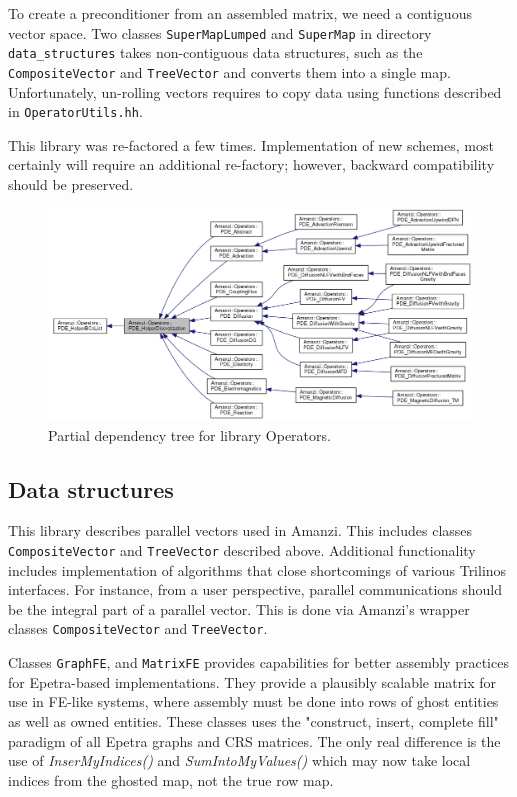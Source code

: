 To create a preconditioner from an assembled matrix, we need a contiguous vector space.
Two classes {\tt SuperMapLumped} and {\tt SuperMap} in directory {\tt data\_structures} 
takes non-conti\-guous data structures, such as the {\tt CompositeVector} and {\tt TreeVector}
and converts them into a single map.
Unfortunately, un-rolling vectors requires to copy data using functions described in
{\tt OperatorUtils.hh}.

This library was re-factored a few times. 
Implementation of new schemes, most certainly will require an additional re-factory;
however, backward compatibility should be preserved.

\begin{figure}[h!]
\includegraphics[width=1.0\textwidth]{figs/operators.png}
\caption{Partial dependency tree for library Operators.\label{fig:operators}}
\end{figure}


\clearpage
\subsection{Data structures}
This library describes parallel vectors used in Amanzi.
This includes classes {\tt CompositeVector} and {\tt TreeVector} described above.
Additional functionality includes implementation of algorithms that close shortcomings
of various Trilinos interfaces.
For instance, from a user perspective, parallel communications should be the integral 
part of a parallel vector. 
This is done via Amanzi's wrapper classes {\tt CompositeVector} and {\tt TreeVector}.

Classes {\tt GraphFE}, and {\tt MatrixFE} provides capabilities for better assembly 
practices for Epetra-based implementations.
They provide a plausibly scalable matrix for use in FE-like systems, where assembly
must be done into rows of ghost entities as well as owned entities.
These classes uses the "construct, insert, complete fill" paradigm of all
Epetra graphs and CRS matrices.
The only real difference is the use of {\it InserMyIndices()} and {\it SumIntoMyValues()}
which may now take local indices from the ghosted map, not the true row map.


